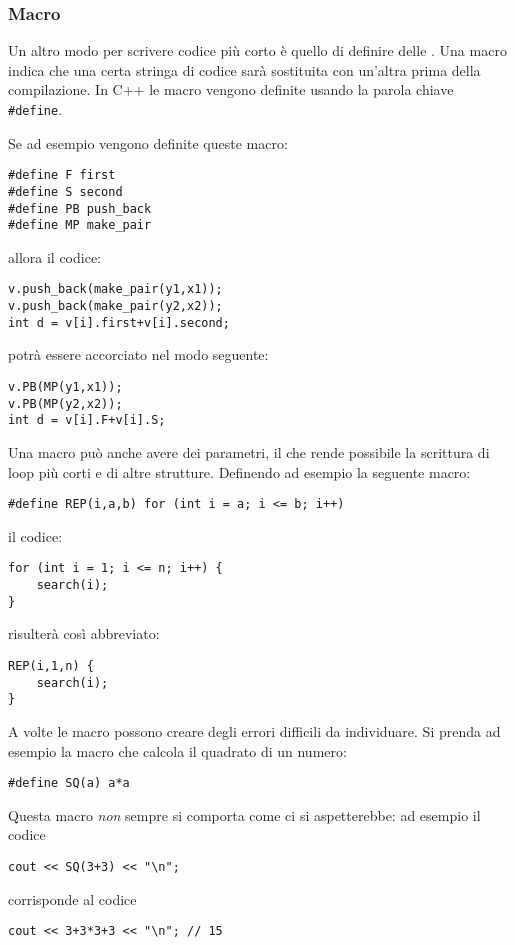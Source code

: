 \subsubsection{Macro}
Un altro modo per scrivere codice più corto
è quello di definire delle .
Una macro indica che una certa stringa di codice
sarà sostituita con un'altra prima della compilazione.
In C++ le macro vengono definite usando la parola
chiave \texttt{\#define}.

Se ad esempio vengono definite queste macro:
\begin{lstlisting}
#define F first
#define S second
#define PB push_back
#define MP make_pair
\end{lstlisting}
allora il codice:
\begin{lstlisting}
v.push_back(make_pair(y1,x1));
v.push_back(make_pair(y2,x2));
int d = v[i].first+v[i].second;
\end{lstlisting}
potrà essere accorciato nel modo seguente:
\begin{lstlisting}
v.PB(MP(y1,x1));
v.PB(MP(y2,x2));
int d = v[i].F+v[i].S;
\end{lstlisting}

Una macro può anche avere dei parametri, 
il che rende possibile la scrittura di loop
più corti e di altre strutture.
Definendo ad esempio la seguente macro:
\begin{lstlisting}
#define REP(i,a,b) for (int i = a; i <= b; i++)
\end{lstlisting}
il codice:
\begin{lstlisting}
for (int i = 1; i <= n; i++) {
    search(i);
}
\end{lstlisting}
risulterà così abbreviato:
\begin{lstlisting}
REP(i,1,n) {
    search(i);
}
\end{lstlisting}

A volte le macro possono creare degli errori
difficili da individuare.
Si prenda ad esempio la macro che calcola 
il quadrato di un numero: 

\begin{lstlisting}
#define SQ(a) a*a
\end{lstlisting}
Questa macro \emph{non} sempre si comporta come ci si aspetterebbe:
ad esempio il codice

\begin{lstlisting}
cout << SQ(3+3) << "\n";
\end{lstlisting}
corrisponde al codice
\begin{lstlisting}
cout << 3+3*3+3 << "\n"; // 15
\end{lstlisting}

